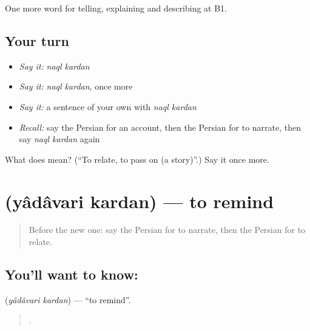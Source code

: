 \begin{grammarlens}[title={What you've built}]
One more word for telling, explaining and describing at B1.
\end{grammarlens}

\subsection*{Your turn}
\begin{itemize}
\raggedright
  \item \emph{Say it:} \emph{naql kardan}
  \item \emph{Say it:} \emph{naql kardan}, once more
  \item \emph{Say it:} a sentence of your own with \emph{naql kardan}
  \item \emph{Recall:} say the Persian for an account, then the Persian for to narrate, then say \emph{naql kardan} again
\end{itemize}

\begin{tcolorbox}[breakable,colback=teal!4,colframe=teal!35!black,title={Before you move on}]
What does   mean? (\textquotedblleft{}To relate, to pass on (a story)\textquotedblright{}.) Say it once more.
\end{tcolorbox}
\section[\texorpdfstring{\fa{یادآوری} \fa{کردن} (yâdâvari kardan)}{یادآوری کردن (yâdâvari kardan)}]{  (yâdâvari kardan) — to remind}

\label{lesson:FA-C346-yadavari-kardan}



\begin{quote}
Before the new one: say the Persian for to narrate, then the Persian for to relate.
\end{quote}

\subsection*{You'll want to know:  }
\textbf{ } (\emph{yâdâvari kardan}) — \textquotedblleft{}to remind\textquotedblright{}.

\begin{quote}
       .
\end{quote}

